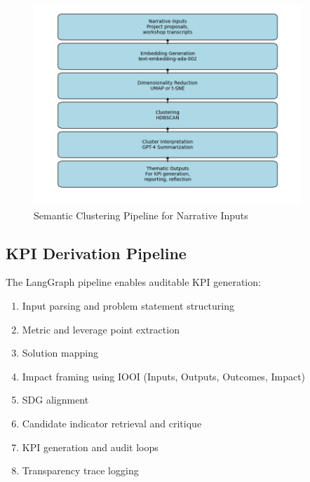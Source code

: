 \begin{figure}[H]
    \centering
    \includegraphics[width=0.9\textwidth]{../fig/clustering_pipeline}
    \caption{Semantic Clustering Pipeline for Narrative Inputs}
    \label{fig:clustering-pipeline}
\end{figure}

\subsection{KPI Derivation Pipeline}\label{subsec:kpi-pipeline}

The LangGraph pipeline enables auditable KPI generation:

\begin{enumerate}
    \item Input parsing and problem statement structuring
    \item Metric and leverage point extraction
    \item Solution mapping
    \item Impact framing using IOOI (Inputs, Outputs, Outcomes, Impact)
    \item SDG alignment
    \item Candidate indicator retrieval and critique
    \item KPI generation and audit loops
    \item Transparency trace logging
\end{enumerate}

